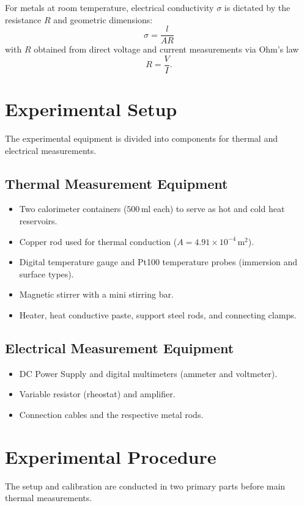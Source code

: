 \documentclass[journal]{IEEEtran}
\begin{document}
For metals at room temperature, electrical conductivity $\sigma$ is dictated by the resistance $R$ and geometric dimensions:
\begin{equation}
    \sigma = \frac{l}{A R}
\end{equation}
with $R$ obtained from direct voltage and current measurements via Ohm's law
\begin{equation}
    R = \frac{V}{I}.
\end{equation}

\section{Experimental Setup}
The experimental equipment is divided into components for thermal and electrical measurements.

\subsection{Thermal Measurement Equipment}
\begin{itemize}
    \item Two calorimeter containers ($500\,\text{ml}$ each) to serve as hot and cold heat reservoirs.
    \item Copper rod used for thermal conduction ($A = 4.91 \times 10^{-4}\,\text{m}^2$).
    \item Digital temperature gauge and Pt100 temperature probes (immersion and surface types).
    \item Magnetic stirrer with a mini stirring bar.
    \item Heater, heat conductive paste, support steel rods, and connecting clamps.
\end{itemize}

\subsection{Electrical Measurement Equipment}
\begin{itemize}
    \item DC Power Supply and digital multimeters (ammeter and voltmeter).
    \item Variable resistor (rheostat) and amplifier.
    \item Connection cables and the respective metal rods.
\end{itemize}

\section{Experimental Procedure}
The setup and calibration are conducted in two primary parts before main thermal measurements.
\end{document}
